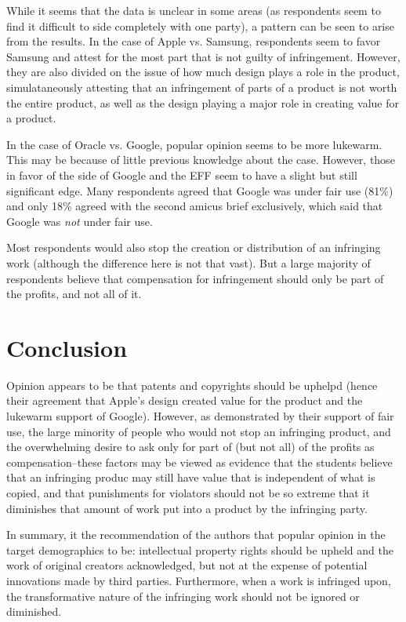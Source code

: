 \documentclass[prodmode,cs196]{acmlarge}
\begin{document}
While it seems that the data is unclear in some areas (as respondents seem to find it difficult to side completely with one party), a pattern can be seen to arise from the results. In the case of Apple vs. Samsung, respondents seem to favor Samsung and attest for the most part that is not guilty of infringement. However, they are also divided on the issue of how much design plays a role in the product, simulataneously attesting that an infringement of parts of a product is not worth the entire product, as well as the design playing a major role in creating value for a product.

In the case of Oracle vs. Google, popular opinion seems to be more lukewarm. This may be because of little previous knowledge about the case. However, those in favor of the side of Google and the EFF seem to have a slight but still significant edge. Many respondents agreed that Google was under fair use (81\%) and only 18\% agreed with the second amicus brief exclusively, which said that Google was \textit{not} under fair use.

Most respondents would also stop the creation or distribution of an infringing work (although the difference here is not that vast). But a large majority of respondents believe that compensation for infringement should only be part of the profits, and not all of it.

\section{Conclusion}

Opinion appears to be that patents and copyrights should be uphelpd (hence their agreement that Apple's design created value for the product and the lukewarm support of Google). However, as demonstrated by their support of fair use, the large minority of people who would not stop an infringing product, and the overwhelming desire to ask only for part of (but not all) of the profits as compensation--these factors may be viewed as evidence that the students believe that an infringing produc may still have value that is independent of what is copied, and that punishments for violators should not be so extreme that it diminishes that amount of work put into a product by the infringing party.

In summary, it the recommendation of the authors that popular opinion in the target demographics to be: intellectual property rights should be upheld and the work of original creators acknowledged, but not at the expense of potential innovations made by third parties. Furthermore, when a work is infringed upon, the transformative nature of the infringing work should not be ignored or diminished.

\nocite{AppleiPhoneDesignPatent}

\label{sect:bib}

{}
\end{document}
